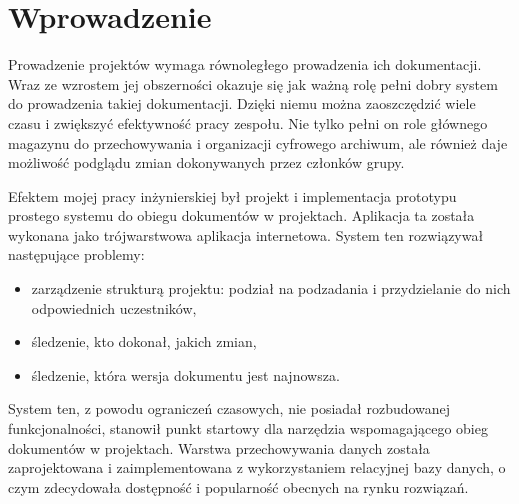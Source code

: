 \chapter{Wprowadzenie}

Prowadzenie projektów wymaga równoległego prowadzenia ich dokumentacji. 
Wraz ze wzrostem jej obszerności okazuje się jak ważną rolę pełni dobry system do prowadzenia takiej dokumentacji.
Dzięki niemu można zaoszczędzić wiele czasu i zwiększyć efektywność pracy zespołu.
Nie tylko pełni on role głównego magazynu do przechowywania i organizacji cyfrowego archiwum, ale również daje możliwość podglądu zmian dokonywanych przez członków grupy.

Efektem mojej pracy inżynierskiej był projekt i implementacja prototypu prostego systemu do obiegu dokumentów w projektach. 
Aplikacja ta została wykonana jako trójwarstwowa aplikacja internetowa.
System ten rozwiązywał następujące problemy:
\begin{itemize}
    \item zarządzenie strukturą projektu: podział na podzadania i przydzielanie do nich odpowiednich uczestników,
    \item śledzenie, kto dokonał, jakich zmian,
    \item śledzenie, która wersja dokumentu jest najnowsza.
\end{itemize}

System ten, z powodu ograniczeń czasowych, nie posiadał rozbudowanej funkcjonalności, stanowił punkt startowy dla narzędzia wspomagającego obieg dokumentów w projektach.
Warstwa przechowywania danych została zaprojektowana i zaimplementowana z wykorzystaniem relacyjnej bazy danych, o czym zdecydowała dostępność i popularność obecnych na rynku rozwiązań. 

